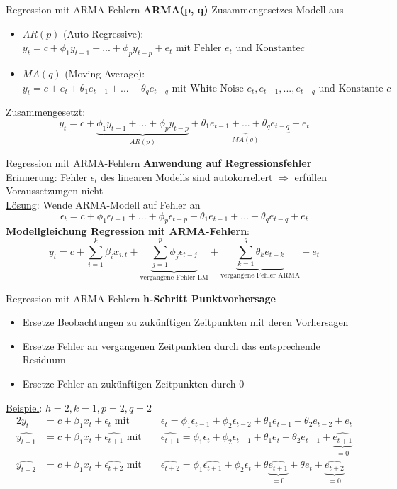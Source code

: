 \begin{frame}{Regression mit ARMA-Fehlern}
	\textbf{ARMA(p, q)}
	Zusammengesetzes Modell aus
	\begin{itemize}
		\item $AR(p)$ (Auto Regressive): $y_{t} = c + \phi_1 y_{t-1} + ... + \phi_p y_{t-p} + e_t \text{ mit Fehler }e_t\text{ und Konstante}c$
		\item $MA(q)$ (Moving Average): $y_{t} = c + e_t + \theta_1 e_{t-1} + ... + \theta_q e_{t-q}\text{ mit White Noise }e_t,e_{t-1},...,e_{t-q}\text{ und Konstante }c$
	\end{itemize}
	Zusammengesetzt:
	$$y_{t} = c + \underbrace{\phi_1 y_{t-1} + ... + \phi_p y_{t-p}}_{AR(p)} + \underbrace{\theta_1 e_{t-1} + ... + \theta_q e_{t-q}}_{MA(q)} + e_t$$
\end{frame}

\begin{frame}{Regression mit ARMA-Fehlern}
	\textbf{Anwendung auf Regressionsfehler} \\
	\underline{Erinnerung}: Fehler $\epsilon_t$ des linearen Modells sind autokorreliert $\Rightarrow$ erfüllen Voraussetzungen nicht\\
	\underline{Lösung}: Wende ARMA-Modell auf Fehler an
	$$\epsilon_{t} = c + \phi_1 \epsilon_{t-1} + ... + \phi_p \epsilon_{t-p} + \theta_1 e_{t-1} + ... + \theta_q e_{t-q} + e_t$$
	\textbf{Modellgleichung Regression mit ARMA-Fehlern}:
	$$y_t = c + \sum_{i=1}^{k}{\beta_i x_{i,t}} + \underbrace{\sum_{j=1}^{p}{\phi_j\epsilon_{t-j}}}_{\text{vergangene Fehler LM}} + \underbrace{\sum_{k=1}^{q}{\theta_k e_{t-k}}}_{\text{vergangene Fehler ARMA}} + e_t$$
	
\end{frame}

\begin{frame}{Regression mit ARMA-Fehlern}
	\textbf{h-Schritt Punktvorhersage}\\
	\begin{itemize}
		\item Ersetze Beobachtungen zu zukünftigen Zeitpunkten mit deren Vorhersagen
		\item Ersetze Fehler an vergangenen Zeitpunkten durch das entsprechende Residuum
		\item Ersetze Fehler an zukünftigen Zeitpunkten durch 0
	\end{itemize}
	\underline{Beispiel}: $h=2, k=1, p=2, q=2$
	\begin{alignat*}{2}
		y_t &= c + \beta_1 x_{t} + \epsilon_t \text{ mit }&&\epsilon_{t} = \phi_1\epsilon_{t-1} + \phi_2\epsilon_{t-2} + \theta_1e_{t-1} + \theta_2e_{t-2} + e_t \\		
		\widehat{y_{t+1}} &= c + \beta_1 x_{t} + \widehat{\epsilon_{t+1}} \text{ mit }&& \widehat{\epsilon_{t+1}} = \phi_1\epsilon_{t} + \phi_2\epsilon_{t-1} + \theta_1e_{t} + \theta_2e_{t-1} + \underbrace{\widehat{e_{t+1}}}_{=0}\\
		\widehat{y_{t+2}} &= c + \beta_1 x_{t} + \widehat{\epsilon_{t+2}}\text{ mit }&&\widehat{\epsilon_{t+2}} = \phi_1\widehat{\epsilon_{t+1}} + \phi_2\epsilon_t + \theta \underbrace{\widehat{e_{t+1}}}_{=0} + \theta e_t + \underbrace{\widehat{e_{t+2}}}_{=0}
	\end{alignat*}
\end{frame}

